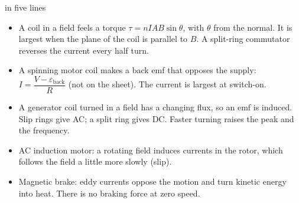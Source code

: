 \begin{summarybox}[unbreakable]{ in five lines}
\begin{itemize}
  \item A coil in a field feels a torque $\tau = nIAB\sin\theta$, with $\theta$ from the
        normal. It is largest when the plane of the coil is parallel to $B$. A split-ring
        commutator reverses the current every half turn.
  \item A spinning motor coil makes a back emf that opposes the supply:
        $I = \dfrac{V - \varepsilon_\mathrm{back}}{R}$ (not on the sheet). The current is
        largest at switch-on.
  \item A generator coil turned in a field has a changing flux, so an emf is induced.
        Slip rings give AC; a split ring gives DC. Faster turning raises the peak and the
        frequency.
  \item AC induction motor: a rotating field induces currents in the rotor, which follows
        the field a little more slowly (slip).
  \item Magnetic brake: eddy currents oppose the motion and turn kinetic energy into heat.
        There is no braking force at zero speed.
\end{itemize}
\end{summarybox}
